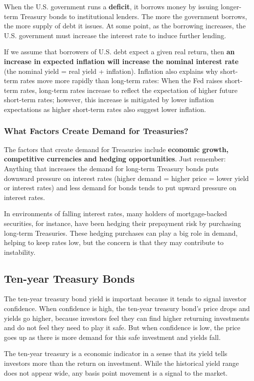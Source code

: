 When the U.S. government runs a \textbf{deficit}, it borrows money by issuing longer-term Treasury bonds to institutional lenders. The more the government borrows, the more supply of debt it issues. At some point, as the borrowing increases, the U.S. government must increase the interest rate to induce further lending.

If we assume that borrowers of U.S. debt expect a given real return, then \textbf{an increase in expected inflation will increase the nominal interest rate} (the nominal yield = real yield + inflation). Inflation also explains why short-term rates move more rapidly than long-term rates: When the Fed raises short-term rates, long-term rates increase to reflect the expectation of higher future short-term rates; however, this increase is mitigated by lower inflation expectations as higher short-term rates also suggest lower inflation.

\subsubsection{What Factors Create Demand for Treasuries?}
The factors that create demand for Treasuries include \textbf{economic growth, competitive currencies and hedging opportunities}. Just remember: Anything that increases the demand for long-term Treasury bonds puts downward pressure on interest rates (higher demand = higher price = lower yield or interest rates) and less demand for bonds tends to put upward pressure on interest rates.

In environments of falling interest rates, many holders of mortgage-backed securities, for instance, have been hedging their prepayment risk by purchasing long-term Treasuries. These hedging purchases can play a big role in demand, helping to keep rates low, but the concern is that they may contribute to instability.


\subsection{Ten-year Treasury Bonds}
The ten-year treasury bond yield is important because it tends to signal investor confidence. When confidence is high, the ten-year treasury bond's price drops and yields go higher, because investors feel they can find higher returning investments and do not feel they need to play it safe. But when confidence is low, the price goes up as there is more demand for this safe investment and yields fall.

The ten-year treasury is a economic indicator in a sense that its yield tells investors more than the return on investment.  While the historical yield range does not appear wide, any basis point movement is a signal to the market.
